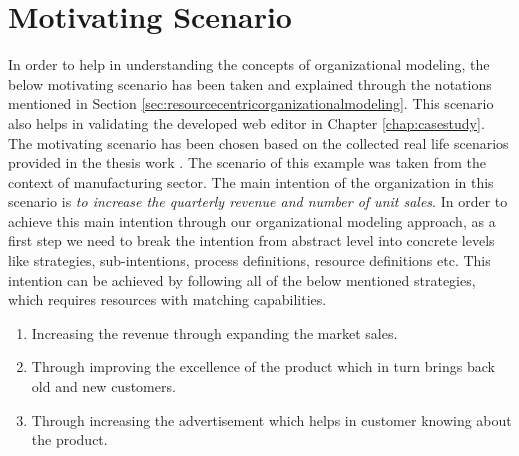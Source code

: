 \chapter{Motivating Scenario}
\label{chap:motivatingScenario}

In order to help in understanding the concepts of organizational modeling, the below motivating scenario has been taken and explained through the notations mentioned in Section \ref{sec:resourcecentricorganizationalmodeling}. This scenario also helps in validating the developed web editor in Chapter \ref{chap:casestudy}. The motivating scenario has been chosen based on the collected real life scenarios provided in the thesis work \cite{Sierr2015}. The scenario of this example was taken from the context of manufacturing sector. The main intention of the organization in this scenario is \textit{to increase the quarterly revenue and number of unit sales}. In order to achieve this main intention through our organizational modeling approach, as a first step we need to break the intention from abstract level into concrete levels like strategies, sub-intentions, process definitions, resource definitions etc. This intention can be achieved by following all of the below mentioned strategies, which requires resources with matching capabilities.  
\begin{enumerate}
	\item Increasing the revenue through expanding the market sales. 
	\item Through improving the excellence of the product which in turn brings back old and new customers.
	\item Through increasing the advertisement which helps in customer knowing about the product.
\end{enumerate}

